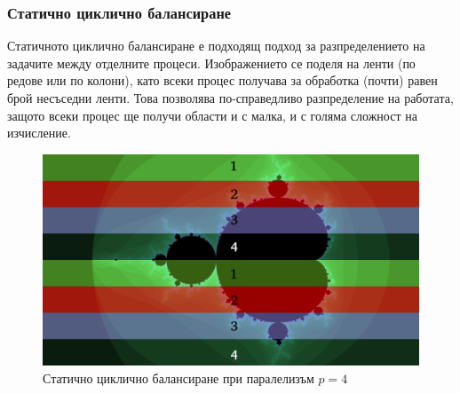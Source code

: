 \documentclass[a4paper,11pt]{article}
\begin{document}
\subsubsection{Статично циклично балансиране}
Статичното циклично балансиране е подходящ подход за разпределението на задачите между отделните процеси. Изображението се поделя на ленти (по редове или по колони), като всеки процес получава за обработка (почти) равен брой несъседни ленти. Това позволява по-справедливо разпределение на работата, защото всеки процес ще получи области и с малка, и с голяма сложност на изчисление. 
\begin{figure}[H]
    \centering
    \includegraphics[width=0.9\linewidth]{images/Decomposition.png}
    \caption{Статично циклично балансиране при паралелизъм $p=4$}
    \label{fig:decomposition}
\end{figure}
\end{document}
